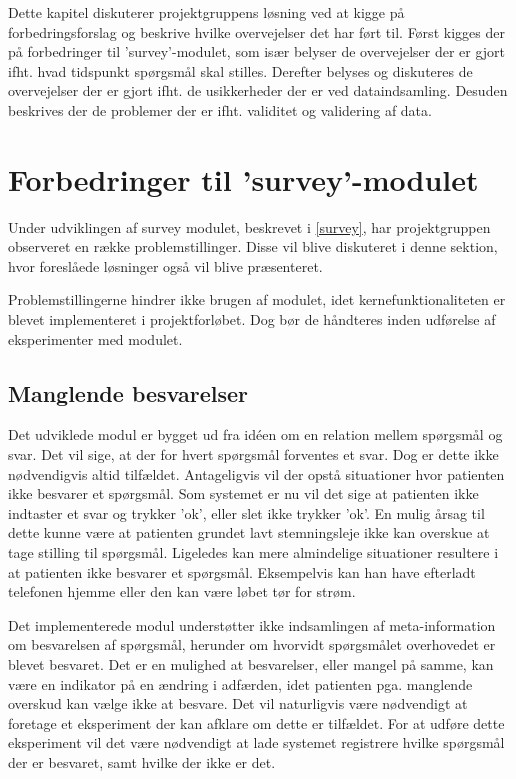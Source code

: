 \label{refleksion}
Dette kapitel diskuterer projektgruppens løsning ved at kigge på forbedringsforslag og beskrive hvilke overvejelser det har ført til.
Først kigges der på forbedringer til 'survey'-modulet, som især belyser de overvejelser der er gjort ifht. hvad tidspunkt spørgsmål skal stilles.
Derefter belyses og diskuteres de overvejelser der er gjort ifht. de usikkerheder der er ved dataindsamling.
Desuden beskrives der de problemer der er ifht. validitet og validering af data.

\section{Forbedringer til 'survey'-modulet}
Under udviklingen af survey modulet, beskrevet i \cref{survey}, har projektgruppen observeret en række problemstillinger.
Disse vil blive diskuteret i denne sektion, hvor foreslåede løsninger også vil blive præsenteret.

Problemstillingerne hindrer ikke brugen af modulet, idet kernefunktionaliteten er blevet implementeret i projektforløbet.
Dog bør de håndteres inden udførelse af eksperimenter med modulet.

\subsection{Manglende besvarelser}\label{reflection:manglende}
Det udviklede modul er bygget ud fra idéen om en relation mellem spørgsmål og svar.
Det vil sige, at der for hvert spørgsmål forventes et svar.
Dog er dette ikke nødvendigvis altid tilfældet.
Antageligvis vil der opstå situationer hvor patienten ikke besvarer et spørgsmål.
Som systemet er nu vil det sige at patienten ikke indtaster et svar og trykker 'ok', eller slet ikke trykker 'ok'.
En mulig årsag til dette kunne være at patienten grundet lavt stemningsleje ikke kan overskue at tage stilling til spørgsmål.
Ligeledes kan mere almindelige situationer resultere i at patienten ikke besvarer et spørgsmål.
Eksempelvis kan han have efterladt telefonen hjemme eller den kan være løbet tør for strøm.

Det implementerede modul understøtter ikke indsamlingen af meta-information om besvarelsen af spørgsmål, herunder om hvorvidt spørgsmålet overhovedet er blevet besvaret.
Det er en mulighed at besvarelser, eller mangel på samme, kan være en indikator på en ændring i adfærden, idet patienten pga. manglende overskud kan vælge ikke at besvare.
Det vil naturligvis være nødvendigt at foretage et eksperiment der kan afklare om dette er tilfældet.
For at udføre dette eksperiment vil det være nødvendigt at lade systemet registrere hvilke spørgsmål der er besvaret, samt hvilke der ikke er det.

